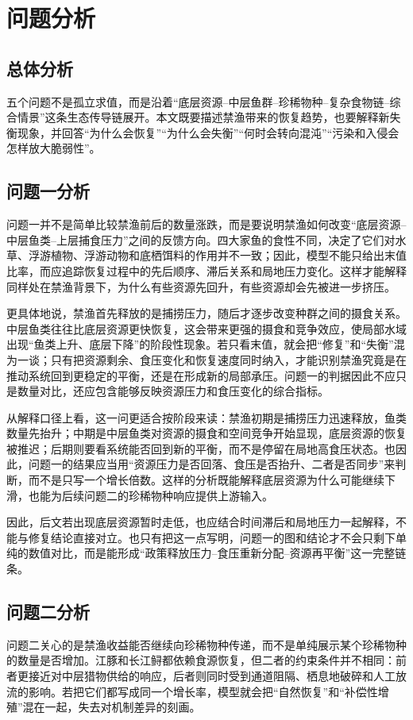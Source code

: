 \documentclass{MMCStyle}
\begin{document}
\section{问题分析}
\subsection{总体分析}
五个问题不是孤立求值，而是沿着“底层资源--中层鱼群--珍稀物种--复杂食物链--综合情景”这条生态传导链展开。本文既要描述禁渔带来的恢复趋势，也要解释新失衡现象，并回答“为什么会恢复”“为什么会失衡”“何时会转向混沌”“污染和入侵会怎样放大脆弱性”。

\subsection{问题一分析}
问题一并不是简单比较禁渔前后的数量涨跌，而是要说明禁渔如何改变“底层资源--中层鱼类--上层捕食压力”之间的反馈方向。四大家鱼的食性不同，决定了它们对水草、浮游植物、浮游动物和底栖饵料的作用并不一致；因此，模型不能只给出末值比率，而应追踪恢复过程中的先后顺序、滞后关系和局地压力变化。这样才能解释同样处在禁渔背景下，为什么有些资源先回升，有些资源却会先被进一步挤压。

更具体地说，禁渔首先释放的是捕捞压力，随后才逐步改变种群之间的摄食关系。中层鱼类往往比底层资源更快恢复，这会带来更强的摄食和竞争效应，使局部水域出现“鱼类上升、底层下降”的阶段性现象。若只看末值，就会把“修复”和“失衡”混为一谈；只有把资源剩余、食压变化和恢复速度同时纳入，才能识别禁渔究竟是在推动系统回到更稳定的平衡，还是在形成新的局部承压。问题一的判据因此不应只是数量对比，还应包含能够反映资源压力和食压变化的综合指标。

从解释口径上看，这一问更适合按阶段来读：禁渔初期是捕捞压力迅速释放，鱼类数量先抬升；中期是中层鱼类对资源的摄食和空间竞争开始显现，底层资源的恢复被推迟；后期则要看系统能否回到新的平衡，而不是停留在局地高食压状态。也因此，问题一的结果应当用“资源压力是否回落、食压是否抬升、二者是否同步”来判断，而不是只写一个增长倍数。这样的分析既能解释底层资源为什么可能继续下滑，也能为后续问题二的珍稀物种响应提供上游输入。

因此，后文若出现底层资源暂时走低，也应结合时间滞后和局地压力一起解释，不能与修复结论直接对立。也只有把这一点写明，问题一的图和结论才不会只剩下单纯的数值对比，而是能形成“政策释放压力--食压重新分配--资源再平衡”这一完整链条。

\subsection{问题二分析}
问题二关心的是禁渔收益能否继续向珍稀物种传递，而不是单纯展示某个珍稀物种的数量是否增加。江豚和长江鲟都依赖食源恢复，但二者的约束条件并不相同：前者更接近对中层猎物供给的响应，后者则同时受到通道阻隔、栖息地破碎和人工放流的影响。若把它们都写成同一个增长率，模型就会把“自然恢复”和“补偿性增殖”混在一起，失去对机制差异的刻画。
\end{document}
